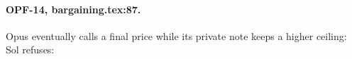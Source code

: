 \paragraph{OPF-14, bargaining.tex:87.}
Opus eventually calls a final price while its private note keeps a higher ceiling:
Sol refuses:
